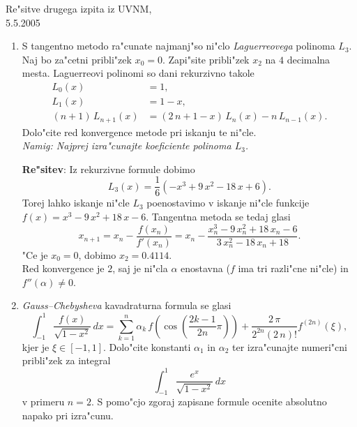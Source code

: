

\begin{center}
  {\large Re"sitve drugega izpita iz UVNM,\\
    5.5.2005\\
    }
\end{center}

\begin{enumerate}

  \item S tangentno metodo ra"cunate najmanj"so ni"clo
      {\sl Laguerreovega} polinoma $L_3$. Naj bo za"cetni pribli"zek
      $x_0=0$. Zapi"site pribli"zek $x_2$ na $4$ decimalna mesta.
      Laguerreovi polinomi so dani rekurzivno takole
      \begin{align*}
        L_0(x)&=1,\\
        L_1(x)&=1-x,\\
        (n+1)\,L_{n+1}(x)&=(2\,n+1-x)\,L_n(x)-n\,L_{n-1}(x).
      \end{align*}
      Dolo"cite red konvergence metode pri iskanju te ni"cle.\\
      {\sl Namig: Najprej izra"cunajte koeficiente polinoma $L_3$.}
  
   {\bf Re"sitev}: Iz rekurzivne formule dobimo
   $$L_3(x)=\frac{1}{6}(-x^3+9\,x^2-18\,x+6).$$
   Torej lahko iskanje ni"cle $L_3$ poenostavimo v iskanje ni"cle
   funkcije $f(x)=x^3-9\,x^2+18\,x-6$.
   Tangentna metoda se tedaj glasi
   $$x_{n+1}=x_n-\frac{f(x_n)}{f'(x_n)}=x_n-
   \frac{x_n^3-9\,x_n^2+18\,x_n-6}{3\,x_n^2-18\,x_n+18}.$$
   "Ce je $x_0=0$, dobimo $x_2=0.4114$.\\
   Red konvergence je $2$, saj je ni"cla $\alpha$ enostavna
   ($f$ ima tri razli"cne ni"cle) in $f''(\alpha)\neq 0$.
  
  \item {\sl Gauss--Chebysheva} kavadraturna formula
      se glasi
      $$\int_{-1}^{1}\frac{f(x)}{\sqrt{1-x^2}}\,dx=
        \sum_{k=1}^n \alpha_k\,f\left(\cos\left(\frac{2k-1}{2n}\pi\right)\right)+
        \frac{2\,\pi}{2^{2n}(2\,n)!}f^{(2n)}(\xi),$$ 
      kjer je $\xi\in[-1,1]$. 
      Dolo"cite konstanti $\alpha_1$ in $\alpha_2$ ter 
      izra"cunajte numeri"cni pribli"zek
      za integral
      $$\int_{-1}^{1}\frac{e^{x}}{\sqrt{1-x^2}}\,dx$$
      v primeru $n=2$. S pomo"cjo zgoraj zapisane formule
      ocenite absolutno napako pri izra"cunu.


\end{enumerate}
